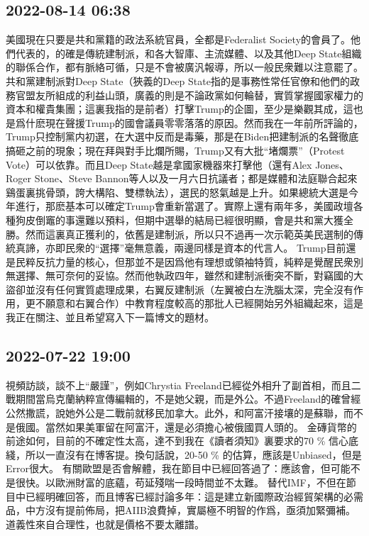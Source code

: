 \documentclass[twocolumn]{ctexart}
\begin{document}
\subsection*{2022-08-14 06:38}

美國現在只要是共和黨籍的政法系統官員，全都是Federalist Society的會員了。他們代表的，的確是傳統建制派，和各大智庫、主流媒體、以及其他Deep State組織的聯係合作，都有脈絡可循，只是不會被廣汎報導，所以一般民衆難以注意罷了。
共和黨建制派對Deep State（狹義的Deep State指的是事務性常任官僚和他們的政務官盟友所組成的利益山頭，廣義的則是不論政黨如何輪替，實質掌握國家權力的資本和權貴集團；這裏我指的是前者）打擊Trump的企圖，至少是樂觀其成，這也是爲什麽現在聲援Trump的國會議員零零落落的原因。然而我在一年前所評論的，Trump只控制黨内初選，在大選中反而是毒藥，那是在Biden把建制派的名聲徹底搞砸之前的現象；現在拜與對手比爛所賜，Trump又有大批“堵爛票”（Protest Vote）可以依靠。而且Deep State越是拿國家機器來打擊他（還有Alex Jones、Roger Stone、Steve Bannon等人以及一月六日抗議者；都是媒體和法庭聯合起來鷄蛋裏挑骨頭，誇大構陷、雙標執法），選民的怒氣越是上升。如果總統大選是今年進行，那麽基本可以確定Trump會重新當選了。實際上還有兩年多，美國政壇各種狗皮倒竈的事還難以預料，但期中選舉的結局已經很明顯，會是共和黨大獲全勝。然而這裏真正獲利的，依舊是建制派，所以只不過再一次示範英美民選制的傳統真諦，亦即民衆的“選擇”毫無意義，兩邊同樣是資本的代言人。
Trump目前還是民粹反抗力量的核心，但那並不是因爲他有理想或領袖特質，純粹是覺醒民衆別無選擇、無可奈何的妥協。然而他執政四年，雖然和建制派衝突不斷，對竊國的大盜卻並沒有任何實質處理成果，右翼反建制派（左翼被白左洗腦太深，完全沒有作用，更不願意和右翼合作）中教育程度較高的那批人已經開始另外組織起來，這是我正在關注、並且希望寫入下一篇博文的題材。
\subsection*{2022-07-22 19:00}

視頻訪談，談不上“嚴謹”，例如Chrystia Freeland已經從外相升了副首相，而且二戰期間當烏克蘭納粹宣傳編輯的，不是她父親，而是外公。不過Freeland的確曾經公然撒謊，說她外公是二戰前就移民加拿大。此外，和阿富汗接壤的是蘇聯，而不是俄國。當然如果美軍留在阿富汗，還是必須擔心被俄國買人頭的。
金磚貨幣的前途如何，目前的不確定性太高，達不到我在《讀者須知》裏要求的70 \% 信心底綫，所以一直沒有在博客提。換句話說，20-50 \% 的估算，應該是Unbiased，但是Error很大。
有關歐盟是否會解體，我在節目中已經回答過了：應該會，但可能不是很快。以歐洲財富的底蘊，苟延殘喘一段時間並不太難。
替代IMF，不但在節目中已經明確回答，而且博客已經討論多年：這是建立新國際政治經貿架構的必需品，中方沒有提前佈局，把AIIB浪費掉，實屬極不明智的作爲，亟須加緊彌補。
道義性來自合理性，也就是價格不要太離譜。
\end{document}
